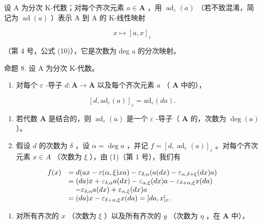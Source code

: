 设 A 为分次 K-代数；对每个齐次元素 \(a \in \mathbf{A}\) ，用 \(\operatorname{ad}_{\varepsilon}(a)\) （若不致混淆，简记为 \(\operatorname{ad}(a)\) ）表示 A 到 A 的 K-线性映射

\[
x \mapsto [ a, x ] _ {\varepsilon}
\]

（第 4 号，公式 (10)），它是次数为 deg a 的分次映射。

命题 8. 设 A 为分次 K-代数。

\begin{enumerate}
\def\labelenumi{(\roman{enumi})}
\tightlist
\item
  对每个 \(\varepsilon\) -导子 \(d: \mathbf{A} \to \mathbf{A}\) 以及每个齐次元素 \(a\) （ \(\mathbf{A}\) 中的），
\end{enumerate}

\[
[ d, \mathrm{ad} _ {\varepsilon} (a) ] _ {\varepsilon} = \mathrm{ad} _ {\varepsilon} (d a).\tag{24}
\]

\begin{enumerate}
\def\labelenumi{(\roman{enumi})}
\setcounter{enumi}{1}
\item
  若代数 \(\mathbf{A}\) 是结合的，则 \(\operatorname{ad}_{\varepsilon}(a)\) 是一个 \(\varepsilon\) -导子（ \(\mathbf{A}\) 的，次数为 \(\deg(a)\) ）。
\item
  假设 \(d\) 的次数为 \(\delta\) ，设 \(\alpha = \deg a\) ，并记 \(f = [d, \operatorname{ad}_{\varepsilon}(a)]_{\varepsilon}\) 。对每个齐次元素 \(x \in A\) （次数为 \(\xi\) ），由 (1)（第 1 号），我们有
\end{enumerate}

\[
\begin{array}{r l} f (x) & = d (a x - \varepsilon (\alpha , \xi) x a) - \varepsilon_ {\delta , \alpha} (a (d x) - \varepsilon_ {\alpha , \delta + \xi} (d x) a) \\ & = (d a) x + \varepsilon_ {\delta , \alpha} a (d x) - \varepsilon_ {\alpha , \xi} (d x) a - \varepsilon_ {\delta + \alpha , \xi} x (d a) \\ & \quad - \varepsilon_ {\delta , \alpha} a (d x) + \varepsilon_ {\alpha , \xi} (d x) a \\ & = (d a) x - \varepsilon_ {\delta + \alpha , \xi} x (d a) = [ d a, x ] _ {\varepsilon}. \end{array}
\]

\begin{enumerate}
\def\labelenumi{(\roman{enumi})}
\setcounter{enumi}{1}
\tightlist
\item
  对所有齐次的 \(x\) （次数为 \(\xi\) ）以及所有齐次的 \(y\) （次数为 \(\eta\) ，在 \(\mathbf{A}\) 中），
\end{enumerate}

